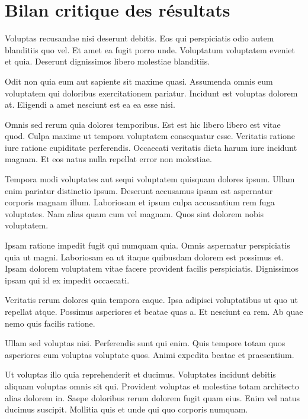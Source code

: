 \documentclass[a4paper]{article}
\begin{document}
\section{Bilan critique des résultats}
\begin{multicols}{2}


Voluptas recusandae nisi deserunt debitis. Eos qui perspiciatis odio autem
    blanditiis quo vel. Et amet ea fugit porro unde. Voluptatum voluptatem
    eveniet et quia. Deserunt dignissimos libero molestiae blanditiis.

Odit non quia eum aut sapiente sit maxime quasi. Assumenda omnis eum voluptatem
    qui doloribus exercitationem pariatur. Incidunt est voluptas dolorem at.
    Eligendi a amet nesciunt est ea ea esse nisi.

Omnis sed rerum quia dolores temporibus. Est est hic libero libero est vitae
    quod. Culpa maxime ut tempora voluptatem consequatur esse. Veritatis ratione
    iure ratione cupiditate perferendis. Occaecati veritatis dicta harum iure
    incidunt magnam. Et eos natus nulla repellat error non molestiae.

Tempora modi voluptates aut sequi voluptatem quisquam dolores ipsum. Ullam enim
    pariatur distinctio ipsum. Deserunt accusamus ipsam est aspernatur corporis
    magnam illum. Laboriosam et ipsum culpa accusantium rem fuga voluptates. Nam
    alias quam cum vel magnam. Quos sint dolorem nobis voluptatem.

Ipsam ratione impedit fugit qui numquam quia. Omnis aspernatur perspiciatis quia
    ut magni. Laboriosam ea ut itaque quibusdam dolorem est possimus et. Ipsam
    dolorem voluptatem vitae facere provident facilis perspiciatis. Dignissimos
    ipsam qui id ex impedit occaecati.

Veritatis rerum dolores quia tempora eaque. Ipsa adipisci voluptatibus ut quo ut
    repellat atque. Possimus asperiores et beatae quas a. Et nesciunt ea rem. Ab
    quae nemo quis facilis ratione.

Ullam sed voluptas nisi. Perferendis sunt qui enim. Quis tempore totam quos
    asperiores eum voluptas voluptate quos. Animi expedita beatae et
    praesentium.

Ut voluptas illo quia reprehenderit et ducimus. Voluptates incidunt debitis
    aliquam voluptas omnis sit qui. Provident voluptas et molestiae totam
    architecto alias dolorem in. Saepe doloribus rerum dolorem fugit quam eius.
    Enim vel natus ducimus suscipit. Mollitia quis et unde qui quo corporis
    numquam.

\end{multicols}
\end{document}
